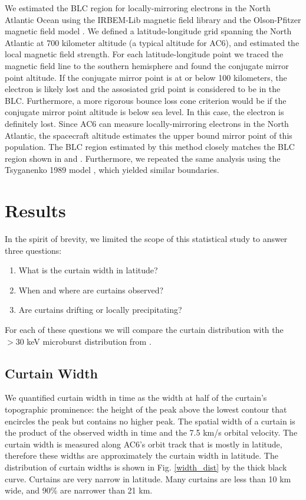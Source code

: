 \documentclass[draft]{agujournal2019}
\begin{document}
We estimated the BLC region for locally-mirroring electrons in the North Atlantic Ocean using the IRBEM-Lib magnetic field library and the Olson-Pfitzer magnetic field model \cite{irbem, Olson1982}. We defined a latitude-longitude grid spanning the North Atlantic at 700 kilometer altitude (a typical altitude for AC6), and estimated the local magnetic field strength. For each latitude-longitude point we traced the magnetic field line to the southern hemisphere and found the conjugate mirror point altitude. If the conjugate mirror point is at or below 100 kilometers, the electron is likely lost and the assosiated grid point is considered to be in the BLC. Furthermore, a more rigorous bounce loss cone criterion would be if the conjugate mirror point altitude is below sea level. In this case, the electron is definitely lost. Since AC6 can measure locally-mirroring electrons in the North Atlantic, the spacecraft altitude estimates the upper bound mirror point of this population. The BLC region estimated by this method closely matches the BLC region shown in  and . Furthermore, we repeated the same analysis using the Tsyganenko 1989 model \cite{Tsyganenko1989}, which yielded similar boundaries.

\section{Results} \label{results}
In the spirit of brevity, we limited the scope of this statistical study to answer three questions:

\begin{enumerate}
\item What is the curtain width in latitude?
\item When and where are curtains observed?
\item Are curtains drifting or locally precipitating?
\end{enumerate} For each of these questions we will compare the curtain distribution with the $>30$ keV microburst distribution from .

\subsection{Curtain Width}
We quantified curtain width in time as the width at half of the curtain's topographic prominence: the height of the peak above the lowest contour that encircles the peak but contains no higher peak. The spatial width of a curtain is the product of the observed width in time and the 7.5 km/s orbital velocity. The curtain width is measured along AC6's orbit track that is mostly in latitude, therefore these widths are approximately the curtain width in latitude. The distribution of curtain widths is shown in Fig. \ref{width_dist} by the thick black curve. Curtains are very narrow in latitude. Many curtains are less than 10 km wide, and 90\% are narrower than 21 km.
	
\end{document}
